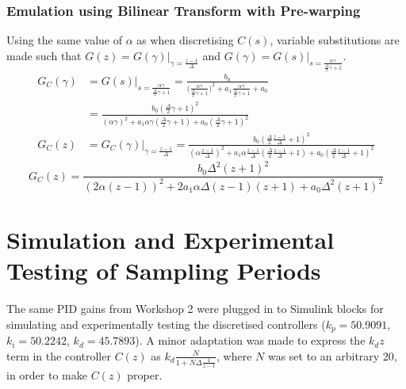 \documentclass[11pt]{article}
\begin{document}
\subsubsection{Emulation using Bilinear Transform with Pre-warping}
Using the same value of $\alpha$ as when discretising $C(s)$, variable substitutions are made such that $G(z) = G(\gamma)|_{\gamma = \frac{z - 1}{\Delta}}$ and $G(\gamma) = G(s)|_{s = \frac{\alpha \gamma}{\frac{\Delta}{2} \gamma + 1}}$.
\begin{align*}
    G_C(\gamma) &= G(s)|_{s = \frac{\alpha \gamma}{\frac{\Delta}{2} \gamma + 1}} = \frac{b_0}{\big(\frac{\alpha \gamma}{\frac{\Delta}{2} \gamma + 1}\big)^2 + a_1 \frac{\alpha \gamma}{\frac{\Delta}{2} \gamma + 1} + a_0}\\
    &= \frac{b_0(\frac{\Delta}{2} \gamma + 1)^2}{(\alpha \gamma)^2 + a_1 \alpha \gamma(\frac{\Delta}{2} \gamma + 1) + a_0(\frac{\Delta}{2} \gamma + 1)^2}\\
    G_C(z) &= G_C(\gamma)|_{\gamma = \frac{z-1}{\Delta} } = \frac{b_0(\frac{\Delta}{2} \frac{z-1}{\Delta} + 1)^2}{(\alpha \frac{z-1}{\Delta})^2 + a_1 \alpha \frac{z-1}{\Delta}(\frac{\Delta}{2} \frac{z-1}{\Delta} + 1) + a_0(\frac{\Delta}{2} \frac{z-1}{\Delta} + 1)^2}
\end{align*}
\begin{equation}\label{eq:GCz}
    G_C(z) = \frac{b_0 \Delta^2 (z+1)^2}{(2\alpha(z-1))^2 + 2a_1 \alpha \Delta (z-1)(z+1) + a_0 \Delta^2 (z+1)^2}
\end{equation}

\section{Simulation and Experimental Testing of Sampling Periods}\label{section:sims}

The same PID gains from Workshop 2 were plugged in to Simulink blocks for simulating and experimentally testing the discretised controllers ($k_p = 50.9091$, $k_i = 50.2242$, $k_d = 45.7893$). A minor adaptation was made to express the $k_d z$ term in the controller $C(z)$ as $k_d \frac{N}{1 + N\Delta \frac{1}{z-1}}$, where $N$ was set to an arbitrary 20, in order to make $C(z)$ proper.\\
\end{document}
